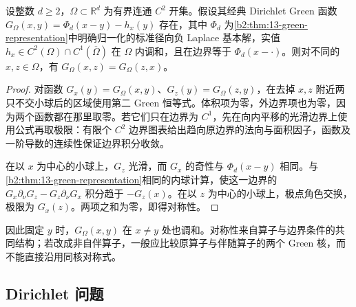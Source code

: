 \begin{proposition}\label{b2:prop:13-green-symmetry}
设整数 \(d\geq2\)，\(\Omega\subset\mathbb R^d\) 为有界连通 \(C^2\) 开集。假设其经典 Dirichlet Green 函数 \(G_\Omega(x,y)=\Phi_d(x-y)-h_x(y)\) 存在，其中 \(\Phi_d\) 为\cref{b2:thm:13-green-representation}中明确归一化的标准径向负 Laplace 基本解，实值 \(h_x\in C^2(\Omega)\cap C^1(\overline\Omega)\) 在 \(\Omega\) 内调和，且在边界等于 \(\Phi_d(x-\cdot)\)。则对不同的 \(x,z\in\Omega\)，有 \(G_\Omega(x,z)=G_\Omega(z,x)\)。
\end{proposition}
\begin{proof}
对函数 \(G_x(y)=G_\Omega(x,y)\)、\(G_z(y)=G_\Omega(z,y)\)，在去掉 \(x,z\) 附近两只不交小球后的区域使用第二 Green 恒等式。体积项为零，外边界项也为零，因为两个函数都在那里取零。若它们只在边界为 \(C^1\)，先在向内平移的光滑边界上使用公式再取极限：有限个 \(C^2\) 边界图表给出趋向原边界的法向与面积因子，函数及一阶导数的连续性保证边界积分收敛。

在以 \(x\) 为中心的小球上，\(G_z\) 光滑，而 \(G_x\) 的奇性与 \(\Phi_d(x-y)\) 相同。与\cref{b2:thm:13-green-representation}相同的内球计算，使这一边界的 \(G_x\partial_\nu G_z-G_z\partial_\nu G_x\) 积分趋于 \(-G_z(x)\)。在以 \(z\) 为中心的小球上，极点角色交换，极限为 \(G_x(z)\)。两项之和为零，即得对称性。
\end{proof}

因此固定 \(y\) 时，\(G_\Omega(x,y)\) 在 \(x\ne y\) 处也调和。对称性来自算子与边界条件的共同结构；若改成非自伴算子，一般应比较原算子与伴随算子的两个 Green 核，而不能直接沿用同核对称式。

\subsection{Dirichlet 问题}
\label{b2:subsec:130402}

